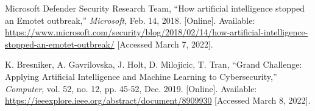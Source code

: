 \begin{thebibliography}{99}
    Microsoft Defender Security Research Team, ``How artificial intelligence stopped an Emotet outbreak,''
    \textit{Microsoft}, Feb. 14, 2018. [Online].
    Available: \href{https://www.microsoft.com/security/blog/2018/02/14/how-artificial-intelligence-stopped-an-emotet-outbreak/}{https://www.microsoft.com/security/blog/2018/02/14/how-artificial-intelligence-stopped-an-emotet-outbreak/}
    [Accessed March 7, 2022].

    K. Bresniker, A. Gavrilovska, J. Holt, D. Milojicic, T. Tran, ``Grand Challenge: Applying Artificial Intelligence and Machine Learning to Cybersecurity,''
    \textit{Computer}, vol. 52, no. 12, pp. 45-52, Dec. 2019. [Online].
    Available: \href{https://ieeexplore.ieee.org/abstract/document/8909930}{https://ieeexplore.ieee.org/abstract/document/8909930}
    [Accessed March 8, 2022].
\end{thebibliography}
